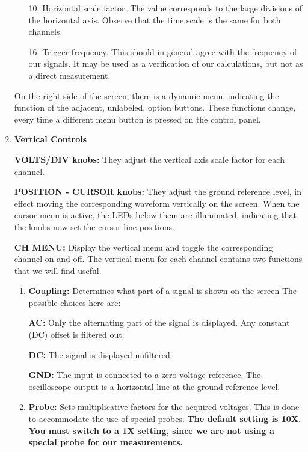 \begin{enumerate}
\begin{itemize}
\item[10.] Horizontal scale factor. The value corresponds to the large
divisions of the horizontal axis. Observe that the time scale is the same for
both channels.

\item[16.] Trigger frequency. This should in general agree with the frequency
of our signals. It may be used as a verification of our calculations, but not
as a direct measurement.

\end{itemize}

On the right side of the screen, there is a dynamic menu, indicating the
function of the adjacent, unlabeled, option buttons. These functions change,
every time a different menu button is pressed on the control panel.

\item {\bf Vertical Controls}

{\bf VOLTS/DIV knobs:} They adjust the vertical axis scale factor for each
channel.

{\bf POSITION - CURSOR knobs:} They adjust the ground reference level, in
effect moving the corresponding waveform vertically on the screen. When the
cursor menu is active, the LEDs below them are illuminated, indicating that
the knobs now set the cursor line positions.

{\bf CH MENU:} Display the vertical menu and toggle the corresponding
channel on and off. The vertical menu for each channel contains two functions
that we will find useful.

\begin{enumerate}

\item {\bf Coupling:} Determines what part of a signal is shown on the screen
The possible choices here are:

{\bf AC:} Only the alternating part of the signal is displayed. Any constant (DC)
offset is filtered out.

{\bf DC:} The signal is displayed unfiltered.

{\bf GND:} The input is connected to a zero voltage reference. The oscilloscope
output is a horizontal line at the ground reference level.

\item {\bf Probe:} Sets multiplicative factors for the acquired voltages. This is
done to accommodate the use of special probes. {\bf The default setting is
10X. You must switch to a 1X setting, since we are not using a special probe for
our measurements.}


\end{enumerate}
\end{enumerate}
